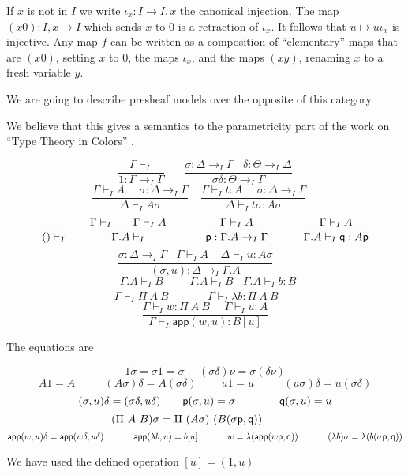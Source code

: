 \documentclass[10pt,a4paper]{article}
\newcommand{\app}{\mathsf{app}}
\newcommand{\pp}{{\sf p}}
\newcommand{\qq}{{\sf q}}
\begin{document}
 If $x$ is not in $I$ we write $\iota_x:I\rightarrow I,x$ the canonical injection. 
The map $(x0):I,x\rightarrow I$ which sends $x$ to $0$ is a retraction of $\iota_x$.
It follows that $u\longmapsto u\iota_x$ is injective.
Any map $f$ can be written as a composition of ``elementary'' maps that are 
$(x0)$, setting $x$ to $0$, the maps $\iota_x$, and the maps $(xy)$, renaming
$x$ to a fresh variable $y$.

 We are going to describe presheaf models over the opposite of this category.

 We believe that this gives a semantics to the parametricity part of the work
on ``Type Theory in Colors'' \cite{BM}.



$$
\frac{\Gamma\vdash_I}{1:\Gamma\to_I \Gamma}~~~~~~~~
\frac{\sigma:\Delta\to_I\Gamma~~~~\delta:\Theta\to_I\Delta}
     {\sigma\delta:\Theta\to_I\Gamma}
$$
$$
\frac{\Gamma\vdash_I A~~~~~~\sigma:\Delta\to_I\Gamma}{\Delta\vdash_I A\sigma}~~~~~
\frac{\Gamma\vdash_I t:A~~~~~~\sigma:\Delta\to_I\Gamma}{\Delta\vdash_I t\sigma:A\sigma}~~~~~
$$
$$
\frac{}{()\vdash_I}~~~~~~
\frac{\Gamma\vdash_I~~~~~\Gamma\vdash_I A}{\Gamma.A\vdash_I}~~~~~~~~~~
\frac{\Gamma\vdash_I A}{\pp:\Gamma.A\to_I\Gamma}~~~~~~~~~
\frac{\Gamma\vdash_I A}{\Gamma.A\vdash_I \qq:A\pp}
$$
$$
\frac{\sigma:\Delta\to_I\Gamma~~~~\Gamma\vdash_I A~~~~~\Delta\vdash_I u:A\sigma}
     {(\sigma,u):\Delta\to_I\Gamma.A}~~~~~~~~
$$
$$
\frac{\Gamma.A\vdash_I B}{\Gamma\vdash_I\Pi~A~B}~~~~~~~~
\frac{\Gamma.A\vdash_I B~~~~\Gamma.A\vdash_I b:B}
     {\Gamma\vdash_I\lambda b:\Pi~A~B}
$$
$$
\frac{\Gamma\vdash_I w:\Pi~A~B~~~~~~\Gamma\vdash_I u:A}
     {\Gamma\vdash_I \app(w,u):B[u]}
$$

\medskip

The equations are

$$
{1\sigma = \sigma 1 = \sigma}~~~~~~{(\sigma\delta)\nu = \sigma(\delta\nu)}
$$
$$
A1 = A~~~~~~~~~~~~(A\sigma)\delta = A(\sigma\delta)~~~~~~~~~~
u1 = u~~~~~~~~~~~~(u\sigma)\delta = u(\sigma\delta)
$$
$$
{(\sigma,u)\delta = (\sigma\delta,u\delta)}~~~~~~{\pp (\sigma,u) = \sigma}~~~~~~~~~~~~{\qq(\sigma,u) = u}
$$
$$
(\Pi~A~B)\sigma = \Pi~(A\sigma)~(B(\sigma\pp,\qq))~~~~~~~~~~
$$
$$
     {\app(w,u)\delta= \app(w\delta,u\delta)}~~~~~~~~~~
     {\app(\lambda b,u)= b[u]}~~~~~~~~~~{w = \lambda (\app(w\pp,\qq))}~~~~~~~~~~{(\lambda b)\sigma = \lambda (b(\sigma\pp,\qq))}
$$
\medskip

 We have used the defined operation $[u] = (1,u)$
\end{document}
